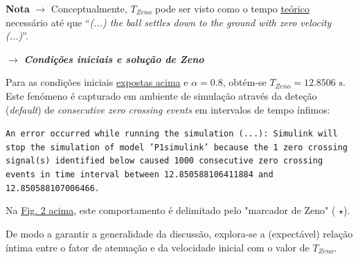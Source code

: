 \vspace{-0.5em}
\noindent \textbf{Nota} $\pmb{\rightarrow}$ Conceptualmente, $T_{Zeno}$ pode ser visto como o tempo \underline{teórico} necessário até que ``\textit{(...) the ball settles down to the ground with zero velocity (...)}''\cite{mathworks-bouncingball}.

\clearpage

\noindent $\pmb{\rightarrow}$ \textbf{\textit{Condições iniciais e solução de Zeno}}

\noindent Para as condições iniciais \hyperref[fig:P1-SistemaCompleto]{expostas acima} e $\alpha = 0.8$, obtém-se $T_{Zeno} = 12.8506\text{ s}$. Este fenómeno é capturado em ambiente de simulação através da deteção (\textit{default}) de \textit{consecutive zero crossing events} em intervalos de tempo ínfimos:

\begin{warning}
    \footnotesize\color{red}\texttt{An error occurred while running the simulation (...): Simulink will stop the simulation of model 'P1simulink' because the 1 zero crossing signal(s) identified below caused 1000 consecutive zero crossing events in time interval between 12.850588106411884 and 12.850588107006466.}
\end{warning}

\vspace{-0.5em}
\noindent Na \hyperref[fig:P1-SistemaCompleto]{Fig. 2 acima}, este comportamento é delimitado pelo "marcador de Zeno" ({\color{red} $\star$}).

De modo a garantir a generalidade da discussão, explora-se a (expectável) relação íntima entre o fator de atenuação e da velocidade inicial com o valor de $T_{Zeno}$. 

